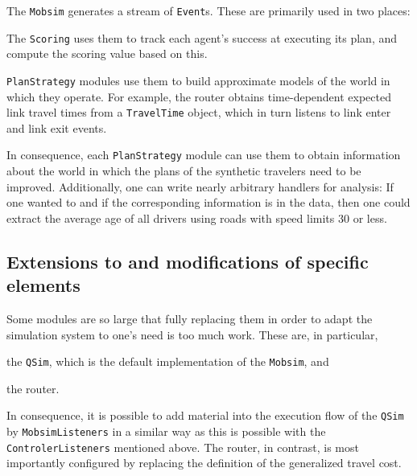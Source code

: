 The \lstinline$Mobsim$ generates a stream of \lstinline$Event$s.  These are primarily used in two places:
\begin{compactitem}

\item The \lstinline$Scoring$ uses them to track each agent's success at executing its plan, and compute the scoring value based on this.

\item \lstinline$PlanStrategy$ modules use them to build approximate models of the world in which they operate.  For example, the router obtains time-dependent expected link travel times from a \lstinline$TravelTime$ object, which in turn listens to link enter and link exit events.
  
\end{compactitem}
In consequence, each \lstinline$PlanStrategy$ module can use them to obtain information about the world in which the plans of the synthetic travelers need to be improved. Additionally, one can write nearly arbitrary handlers for analysis: If one wanted to and if the corresponding information is in the data, then one could extract the average age of all drivers using roads with speed limits 30 or less.


\subsection{Extensions to and modifications of specific elements}

Some modules are so large that fully replacing them in order to adapt the simulation system to one's need is too much work.  These are, in particular,
\begin{compactitem}
\item the \lstinline$QSim$, which is the default implementation of the \lstinline$Mobsim$, and
\item the router.
\end{compactitem}
In consequence, it is possible to add material into the execution flow of the \lstinline$QSim$ by \lstinline$MobsimListeners$ in a similar way as this is possible with the \lstinline$ControlerListeners$ mentioned above.
%
The router, in contrast, is most importantly configured by replacing the definition of the generalized travel cost. 

